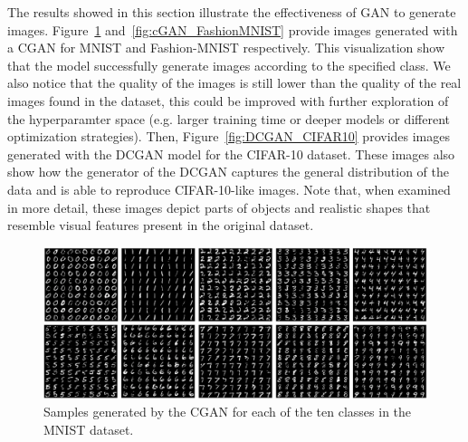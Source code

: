 The results showed in this section illustrate the effectiveness of GAN to generate images. Figure~\ref{fig:cGAN_MNIST} and~\ref{fig:cGAN_FashionMNIST} provide images generated with a CGAN for MNIST and Fashion-MNIST respectively. This visualization show that the model successfully generate images according to the specified class. We also notice that the quality of the images is still lower than the quality of the real images found in the dataset, this could be improved with further exploration of the hyperparamter space (e.g. larger training time or deeper models or different optimization strategies). Then, Figure~\ref{fig:DCGAN_CIFAR10} provides images generated with the DCGAN model for the CIFAR-10 dataset. These images also show how the generator of the DCGAN captures the general distribution of the data and is able to reproduce CIFAR-10-like images. Note that, when examined in more detail, these images depict parts of objects and realistic shapes that resemble visual features present in the original dataset.


\begin{figure}
    \centering
    \caption{\label{fig:cGAN_MNIST} Samples generated by the CGAN for each of the ten classes in the MNIST dataset.}
    \vspace{-0.1in}
    \includegraphics[width=0.95\columnwidth]{fig_datasynth/mnist_cGANs.png} 
\end{figure}

